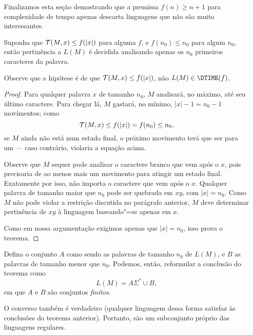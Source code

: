 Finalizamos esta seção demostrando que
a premissa $f(n) \geq n+1$ para complexidade de tempo
apenas descarta linguagens que não são muito interessantes.

\begin{proposition}
    Suponha que ${\mathcal{T}}(M, x) \leq f(|x|)$ para alguma $f$,
    e $f(n_0) \leq n_0$ para algum $n_0$,
    então pertinência a $L(M)$
    é decidida analisando apenas os $n_0$ primeiros caracteres da palavra.
    \label{thm:sublinear_time_regular}
\end{proposition}

Observe que a hipótese é de que
${\mathcal{T}}(M, x) \leq f(|x|)$,
não
$L(M) \in \DTIME(f)$.

\begin{proof}
    Para qualquer palavra $x$ de tamanho $n_0$,
    $M$ analisará,
    no máximo,
    até seu último caractere.
    Para chegar lá, $M$ gastará,
    no mínimo,
    $|x| - 1 = n_0 - 1$ movimentos;
    como
    \begin{equation*}
        {\mathcal{T}}(M, x) \leq f(|x|) = f(n_0) \leq n_0,
    \end{equation*}
    se $M$ ainda não está num estado final,
    o próximo movimento terá que ser para um
    --- caso contrário,
    violaria a equação acima.

    Observe que $M$ sequer pode analisar o caractere branco
    que vem após o $x$,
    pois precisaria de ao menos mais um movimento
    para atingir um estado final.
    Exatamente por isso, não importa o caractere que vem após o $x$.
    Qualquer palavra de tamanho maior que $n_0$
    pode ser quebrada em $xy$, com $|x| = n_0$.
    Como $M$ não pode violar a restrição discutida no parágrafo anterior,
    $M$ deve determinar pertinência de $xy$ à linguagem
    baseando"=se apenas em $x$.

    Como em nossa argumentação
    exigimos apenas que $|x| = n_0$,
    isso prova o teorema.
\end{proof}

Defina o conjunto $A$ como sendo as palavras de tamanho $n_0$ de $L(M)$,
e $B$ as palavras de tamanho menor que $n_0$.
Podemos, então, reformular a conclusão do teorema como
\begin{equation*}
    L(M) = A\Sigma^* \cup B,
\end{equation*}
em que $A$ e $B$ são conjuntos \emph{finitos}.

O converso também é verdadeiro
(qualquer linguagem dessa forma
satisfaz às conclusões do teorema anterior).
Portanto, são um subconjunto próprio
das linguagens regulares.
